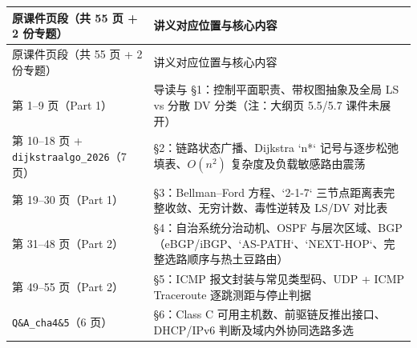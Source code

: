 
\begingroup\small\setlength{\tabcolsep}{3pt}\renewcommand{\arraystretch}{1.22}
\begin{longtable}{@{}>{\raggedright\arraybackslash}p{}>{\raggedright\arraybackslash}p{}@{}}
\toprule
原课件页段（共 55 页 + 2 份专题） & 讲义对应位置与核心内容 \\
\midrule\endfirsthead
原课件页段（共 55 页 + 2 份专题） & 讲义对应位置与核心内容 \\
\midrule\endhead
\bottomrule\endfoot
第 1–9 页（Part 1） & 导读与 §1：控制平面职责、带权图抽象及全局 LS vs 分散 DV 分类（注：大纲页 5.5/5.7 课件未展开） \\
第 10–18 页 + \texttt{dijkstraalgo\_2026}（7 页） & §2：链路状态广播、Dijkstra `n*` 记号与逐步松弛填表、$O(n^2)$ 复杂度及负载敏感路由震荡 \\
第 19–30 页（Part 1） & §3：Bellman–Ford 方程、`2-1-7` 三节点距离表完整收敛、无穷计数、毒性逆转及 LS/DV 对比表 \\
第 31–48 页（Part 2） & §4：自治系统分治动机、OSPF 与层次区域、BGP（eBGP/iBGP、`AS-PATH`、`NEXT-HOP`、完整选路顺序与热土豆路由） \\
第 49–55 页（Part 2） & §5：ICMP 报文封装与常见类型码、UDP + ICMP Traceroute 逐跳测距与停止判据 \\
\texttt{Q\&A\_cha4\&5}（6 页） & §6：Class C 可用主机数、前驱链反推出接口、DHCP/IPv6 判断及域内外协同选路多选 \\
\end{longtable}\endgroup
